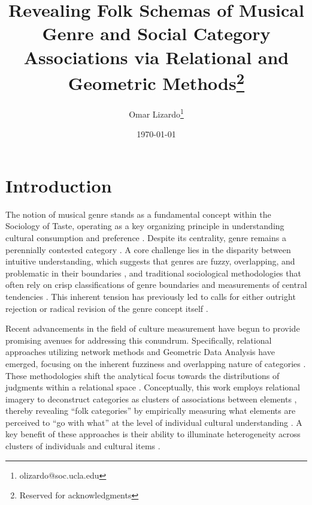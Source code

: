 \documentclass[12pt]{article}
\begin{document}
\title{Revealing Folk Schemas of Musical Genre and Social Category Associations via Relational and Geometric Methods\thanks{Reserved for acknowledgments}}
\author[1]{Omar Lizardo\thanks{olizardo@soc.ucla.edu}}

\renewcommand\Authands{ and }

\date{\normalsize \today}	
\maketitle

\newpage
\begin{abstract}
\end{abstract}
\newpage
\section*{Introduction}
The notion of musical genre stands as a fundamental concept within the Sociology of Taste, operating as a key organizing principle in understanding cultural consumption and preference \citep{dimaggio1987classification-758, lena2012banding-4b5, lena2008classification-1d7}. Despite its centrality, genre remains a perennially contested category \citep{lena2015relational-21f, vlegels2017music-360}. A core challenge lies in the disparity between intuitive understanding, which suggests that genres are fuzzy, overlapping, and problematic in their boundaries \citep{lizardo2024from-ddd, goldberg2016what-4e3}, and traditional sociological methodologies that often rely on crisp classifications of genre boundaries and measurements of central tendencies \citep{monk2022inequality-699}. This inherent tension has previously led to calls for either outright rejection or radical revision of the genre concept itself \citep{lena2015relational-21f}.

Recent advancements in the field of culture measurement have begun to provide promising avenues for addressing this conundrum. Specifically, relational approaches utilizing network methods and Geometric Data Analysis have emerged, focusing on the inherent fuzziness and overlapping nature of categories \citep{lizardo2024from-ddd}. These methodologies shift the analytical focus towards the distributions of judgments within a relational space \citep{puetz2017fields-f30}. Conceptually, this work employs relational imagery to deconstruct categories as clusters of associations between elements \citep{mcdonnell2024making-b02}, thereby revealing ``folk categories'' by empirically measuring what elements are perceived to ``go with what'' at the level of individual cultural understanding \citep{goldberg2018beyond-f2f}. A key benefit of these approaches is their ability to illuminate heterogeneity across clusters of individuals and cultural items \citep{goldberg2011mapping-77a, vlegels2017music-360}.
\end{document}
